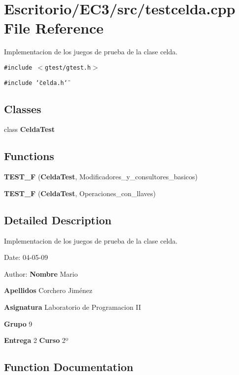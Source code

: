 \section{Escritorio/EC3/src/testcelda.cpp File Reference}
\label{testcelda_8cpp}
Implementacion de los juegos de prueba de la clase celda. 

{\tt \#include $<$gtest/gtest.h$>$}\par
{\tt \#include \char`\"{}celda.h\char`\"{}}\par
\subsection*{Classes}
\begin{CompactItemize}
\item 
class {\bf CeldaTest}
\end{CompactItemize}
\subsection*{Functions}
\begin{CompactItemize}
\item 
{\bf TEST\_\-F} ({\bf CeldaTest}, Modificadores\_\-y\_\-consultores\_\-basicos)
\item 
{\bf TEST\_\-F} ({\bf CeldaTest}, Operaciones\_\-con\_\-llaves)
\end{CompactItemize}


\subsection{Detailed Description}
Implementacion de los juegos de prueba de la clase celda. 

\begin{Desc}
\item[Date:]04-05-09 \end{Desc}
\begin{Desc}
\item[Author:]{\bf Nombre} Mario \par
 {\bf Apellidos} Corchero Jiménez \par
 {\bf Asignatura} Laboratorio de Programacion II \par
 {\bf Grupo} 9 \par
 {\bf Entrega} 2 {\bf Curso} 2º \end{Desc}


\subsection{Function Documentation}
